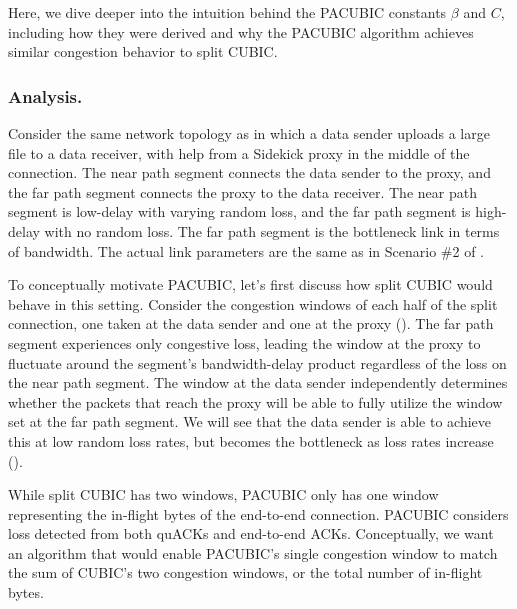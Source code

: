 

Here, we dive deeper into the intuition behind the PACUBIC constants $\beta$
and $C$, including how they were derived and why
the PACUBIC algorithm achieves similar congestion behavior to split CUBIC.

\subsubsection{Analysis.}

Consider the same network topology as  in which a
data sender uploads a large file to a data receiver, with help from a Sidekick
proxy in the middle of the connection. The near path segment connects the data sender
to the proxy, and the far path segment connects the proxy to the data receiver.
The near path segment is low-delay with varying random loss, and the far path segment is
high-delay with no random loss. The far path segment is the bottleneck link in terms
of bandwidth.
The actual link parameters are the same as in Scenario \#2 of
.

To conceptually motivate PACUBIC, let's first discuss how split CUBIC would
behave in this setting.
Consider the congestion windows of each half of the split
connection, one taken at the data sender and one at the proxy
(). The far path
segment experiences only congestive loss, leading the window at the proxy to
fluctuate around the segment's bandwidth-delay product regardless of the loss on the near path
segment. The window at the data sender independently determines whether the
packets that reach the proxy will be able to fully utilize the window set at
the far path segment. We will see that the data sender is able to achieve this at low random
loss rates, but becomes the bottleneck as loss rates increase
().

While split CUBIC has two windows, PACUBIC only has one
window representing the in-flight bytes of the end-to-end connection.
PACUBIC considers loss detected from both quACKs and end-to-end ACKs.
Conceptually, we want an algorithm that would enable PACUBIC's single
congestion window to match the sum of CUBIC's two congestion windows, or
the total number of in-flight bytes.

